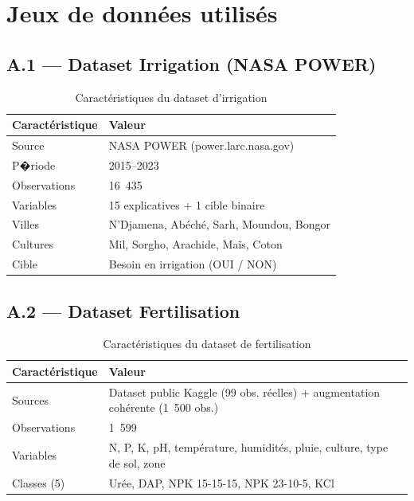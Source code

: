
\chapter{Jeux de données utilisés}
\label{ann:datasets}

\section*{A.1 --- Dataset Irrigation (NASA POWER)}

\begin{table}[H]
	\centering
	\caption{Caractéristiques du dataset d'irrigation}
	\label{tab:ann_irr}
	\begin{tabularx}{\textwidth}{lX}
		\toprule
		\textbf{Caractéristique} & \textbf{Valeur} \\
		\midrule
		Source          & NASA POWER (power.larc.nasa.gov) \\
		P�riode         & 2015--2023 \\
		Observations    & 16~435 \\
		Variables       & 15 explicatives + 1 cible binaire \\
		Villes          & N'Djamena, Abéché, Sarh, Moundou, Bongor \\
		Cultures        & Mil, Sorgho, Arachide, Maïs, Coton \\
		Cible           & Besoin en irrigation (OUI / NON) \\
		\bottomrule
	\end{tabularx}
\end{table}

\section*{A.2 --- Dataset Fertilisation}

\begin{table}[H]
	\centering
	\caption{Caractéristiques du dataset de fertilisation}
	\label{tab:ann_fert}
	\begin{tabularx}{\textwidth}{lX}
		\toprule
		\textbf{Caractéristique} & \textbf{Valeur} \\
		\midrule
		Sources         & Dataset public Kaggle (99 obs. réelles)
		+ augmentation cohérente (1~500 obs.) \\
		Observations    & 1~599 \\
		Variables       & N, P, K, pH, température, humidités, pluie,
		culture, type de sol, zone \\
		Classes (5)     & Urée, DAP, NPK 15-15-15, NPK 23-10-5, KCl \\
		\bottomrule
	\end{tabularx}
\end{table}

